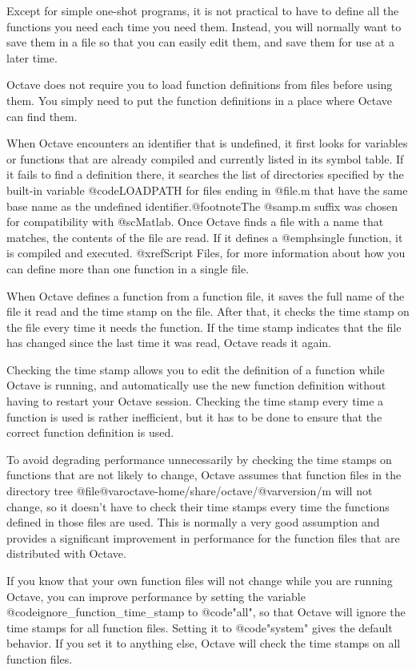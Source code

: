 Except for simple one-shot programs, it is not practical to have to
define all the functions you need each time you need them.  Instead, you
will normally want to save them in a file so that you can easily edit
them, and save them for use at a later time.

Octave does not require you to load function definitions from files
before using them.  You simply need to put the function definitions in a
place where Octave can find them.

When Octave encounters an identifier that is undefined, it first looks
for variables or functions that are already compiled and currently
listed in its symbol table.  If it fails to find a definition there, it
searches the list of directories specified by the built-in variable
@code{LOADPATH} for files ending in @file{.m} that have the same base
name as the undefined identifier.@footnote{The @samp{.m} suffix was
chosen for compatibility with @sc{Matlab}.}  Once Octave finds a file
with a name that matches, the contents of the file are read.  If it
defines a @emph{single} function, it is compiled and executed.
@xref{Script Files}, for more information about how you can define more
than one function in a single file.

When Octave defines a function from a function file, it saves the full
name of the file it read and the time stamp on the file.  After
that, it checks the time stamp on the file every time it needs the
function.  If the time stamp indicates that the file has changed since
the last time it was read, Octave reads it again.

Checking the time stamp allows you to edit the definition of a function
while Octave is running, and automatically use the new function
definition without having to restart your Octave session.  Checking the
time stamp every time a function is used is rather inefficient, but it
has to be done to ensure that the correct function definition is used.

To avoid degrading performance unnecessarily by checking the time stamps
on functions that are not likely to change, Octave assumes that function
files in the directory tree
@file{@var{octave-home}/share/octave/@var{version}/m}
will not change, so it doesn't have to check their time stamps every time the
functions defined in those files are used.  This is normally a very good
assumption and provides a significant improvement in performance for the
function files that are distributed with Octave.

If you know that your own function files will not change while you are
running Octave, you can improve performance by setting the variable
@code{ignore_function_time_stamp} to @code{"all"}, so that Octave will
ignore the time stamps for all function files.  Setting it to
@code{"system"} gives the default behavior.  If you set it to anything
else, Octave will check the time stamps on all function files.

